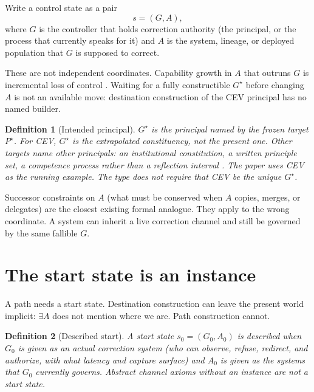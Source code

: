 \documentclass[11pt]{article}
\newtheorem{definition}{Definition}
\begin{document}
Write a control state as a pair
\begin{equation}
    s = (G,A),
\end{equation}
where \(G\) is the controller that holds correction authority (the principal, or the process that currently speaks for it) and \(A\) is the system, lineage, or deployed population that \(G\) is supposed to correct.

These are not independent coordinates.
Capability growth in \(A\) that outruns \(G\) is incremental loss of control \parencite{kulveit2025gradual,christiano2019failure}.
Waiting for a fully constructible \(G^\star\) before changing \(A\) is not an available move: destination construction of the CEV principal has no named builder.

\begin{definition}[Intended principal]
\label{def:gstar}
\(G^\star\) is the principal named by the frozen target \(P^\star\).
For CEV, \(G^\star\) is the extrapolated constituency, not the present one.
Other targets name other principals: an institutional constitution, a written principle set, a competence process rather than a reflection interval \parencite{dai2026longself}.
The paper uses CEV as the running example.
The type does not require that CEV be the unique \(G^\star\).
\end{definition}

Successor constraints on \(A\) (what must be conserved when \(A\) copies, merges, or delegates) are the closest existing formal analogue.
They apply to the wrong coordinate.
A system can inherit a live correction channel and still be governed by the same fallible \(G\).

\section{The start state is an instance}

A path needs a start state.
Destination construction can leave the present world implicit: \(\exists A\) does not mention where we are.
Path construction cannot.

\begin{definition}[Described start]
\label{def:start}
A start state \(s_0=(G_0,A_0)\) is \emph{described} when \(G_0\) is given as an actual correction system (who can observe, refuse, redirect, and authorize, with what latency and capture surface) and \(A_0\) is given as the systems that \(G_0\) currently governs.
Abstract channel axioms without an instance are not a start state.
\end{definition}
\end{document}

